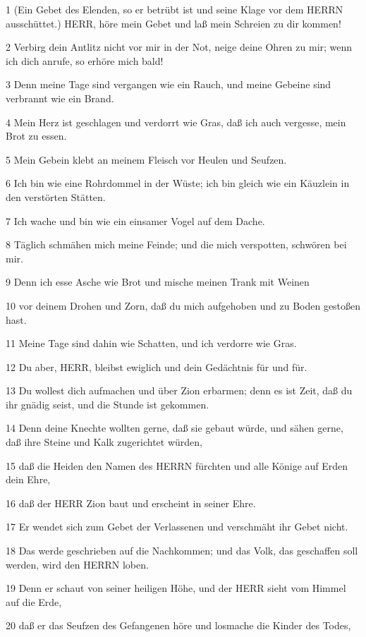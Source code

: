 \par 1 (Ein Gebet des Elenden, so er betrübt ist und seine Klage vor dem HERRN ausschüttet.) HERR, höre mein Gebet und laß mein Schreien zu dir kommen!
\par 2 Verbirg dein Antlitz nicht vor mir in der Not, neige deine Ohren zu mir; wenn ich dich anrufe, so erhöre mich bald!
\par 3 Denn meine Tage sind vergangen wie ein Rauch, und meine Gebeine sind verbrannt wie ein Brand.
\par 4 Mein Herz ist geschlagen und verdorrt wie Gras, daß ich auch vergesse, mein Brot zu essen.
\par 5 Mein Gebein klebt an meinem Fleisch vor Heulen und Seufzen.
\par 6 Ich bin wie eine Rohrdommel in der Wüste; ich bin gleich wie ein Käuzlein in den verstörten Stätten.
\par 7 Ich wache und bin wie ein einsamer Vogel auf dem Dache.
\par 8 Täglich schmähen mich meine Feinde; und die mich verspotten, schwören bei mir.
\par 9 Denn ich esse Asche wie Brot und mische meinen Trank mit Weinen
\par 10 vor deinem Drohen und Zorn, daß du mich aufgehoben und zu Boden gestoßen hast.
\par 11 Meine Tage sind dahin wie Schatten, und ich verdorre wie Gras.
\par 12 Du aber, HERR, bleibst ewiglich und dein Gedächtnis für und für.
\par 13 Du wollest dich aufmachen und über Zion erbarmen; denn es ist Zeit, daß du ihr gnädig seist, und die Stunde ist gekommen.
\par 14 Denn deine Knechte wollten gerne, daß sie gebaut würde, und sähen gerne, daß ihre Steine und Kalk zugerichtet würden,
\par 15 daß die Heiden den Namen des HERRN fürchten und alle Könige auf Erden dein Ehre,
\par 16 daß der HERR Zion baut und erscheint in seiner Ehre.
\par 17 Er wendet sich zum Gebet der Verlassenen und verschmäht ihr Gebet nicht.
\par 18 Das werde geschrieben auf die Nachkommen; und das Volk, das geschaffen soll werden, wird den HERRN loben.
\par 19 Denn er schaut von seiner heiligen Höhe, und der HERR sieht vom Himmel auf die Erde,
\par 20 daß er das Seufzen des Gefangenen höre und losmache die Kinder des Todes,
